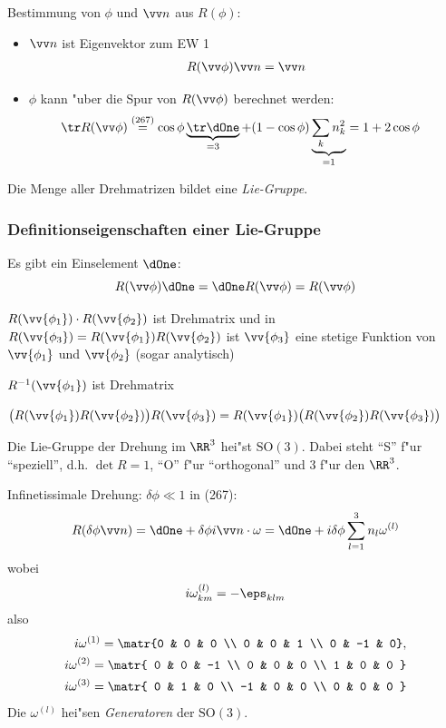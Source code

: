 \documentclass[a4paper]{scrartcl}
\begin{document}
{Bestimmung von $\phi$ und $\vv n$ aus $R(\phi)$:
\begin{itemize}
\item $\vv n$ ist Eigenvektor zum EW 1
\begin{align}
R(\vv \phi) \vv n = \vv n
\end{align}
\item $\phi$ kann "uber die Spur von $R(\vv \phi)$ berechnet werden:
\begin{align}
\tr R(\vv \phi) & \stackrel{(267)}= \cos \phi \underbrace{ \tr \dOne}_{=3} + (1 - \cos \phi) \underbrace{\sum_k n_k^2 }_{=1} = 1 + 2 \cos \phi
\end{align}
\end{itemize}
Die Menge aller Drehmatrizen bildet eine \emph{Lie-Gruppe}.

\subsubsection*{Definitionseigenschaften einer Lie-Gruppe}

\begin{1aufz}
\item Es gibt ein Einselement $\dOne$:
$$R(\vv \phi) \dOne = \dOne R(\vv \phi) = R( \vv \phi)$$
\item $R(\vv{\phi_1} ) \cdot R( \vv {\phi_2})$ ist Drehmatrix und in $R(\vv{\phi_3}) = R(\vv{\phi_1})R(\vv{\phi_2})$ ist $\vv{\phi_3}$ eine stetige Funktion von $\vv{\phi_1}$ und $\vv {\phi_2}$ (sogar analytisch)
\item $R^{-1}(\vv{\phi_1})$ ist Drehmatrix 
\item $\big( R(\vv{\phi_1}) R(\vv{\phi_2}) \big) R(\vv{\phi_3}) = R(\vv{\phi_1}) \big( R(\vv{\phi_2})R(\vv{\phi_3}) \big)$
\end{1aufz}
Die Lie-Gruppe der Drehung im $\RR^3$ hei"st $\mathrm{SO}(3)$. Dabei steht "`S"' f"ur "`speziell"', d.h. $\det R = 1$, "`O"' f"ur "`orthogonal"' und 3 f"ur den $\RR^3$.

Infinetissimale Drehung: $\delta \phi \ll 1$ in (267):
\begin{align}
R( \delta \phi \vv n) = \dOne + \delta \phi i \vv n \cdot  \omega = \dOne + i \delta \phi \sum_{l=1}^3 n_l \omega^{(l)}
\end{align}
wobei
\begin{align}
i \omega_{km}^{(l)}  = - \eps_{klm}
\end{align}
also
\begin{align}
i \omega^{(1)} = \matr{0 & 0 & 0 \\ 0 & 0 & 1 \\ 0 & -1 & 0}, \\
i \omega^{(2)} = \matr{ 0 & 0 & -1 \\ 0 & 0 & 0 \\ 1 & 0 & 0 } \\
i \omega^{(3)} = \matr{ 0 & 1 & 0 \\ -1 & 0 & 0 \\ 0 & 0 & 0 }
\end{align}
Die $\omega^{(l)}$ hei"sen \emph{Generatoren} der $\mathrm{SO}(3)$.

}
\end{document}
